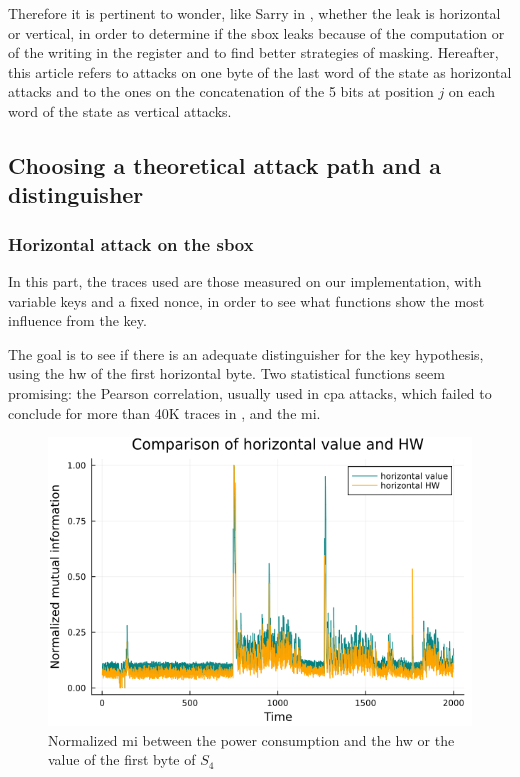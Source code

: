 \documentclass[11pt,technote]{IEEEtran}
\begin{document}
		Therefore it is pertinent to wonder, like Sarry in \cite{these}, whether the leak is horizontal or vertical, in order to determine if the \ac{sbox} leaks because of the computation or of the writing in the register and to find better strategies of masking. Hereafter, this article refers to attacks on one byte of the last word of the state as horizontal attacks and to the ones on the concatenation of the 5 bits at position $j$ on each word of the state as vertical attacks.
		
		\subsection{Choosing a theoretical attack path and a distinguisher} \label{choice}
		\subsubsection{Horizontal attack on the \ac{sbox}}
		In this part, the traces used are those measured on our implementation, with variable keys and a fixed nonce, in order to see what functions show the most influence from the key.
		
		The goal is to see if there is an adequate distinguisher for the key hypothesis, using the \ac{hw} of the first horizontal byte. Two statistical functions seem promising: the Pearson correlation, usually used in \ac{cpa} attacks, which failed to conclude for more than 40K traces in \cite{dl_cpa}, and the \ac{mi}.
		
		\begin{figure}[h]
		\centering
		\includegraphics[scale=0.4]{img_files/horizontal_one_byte}
		\caption{Normalized \ac{mi} between the power consumption and the \ac{hw} or the value of the first byte of $S_4$}
		\label{hHW&val}
		\end{figure}
		
\end{document}
